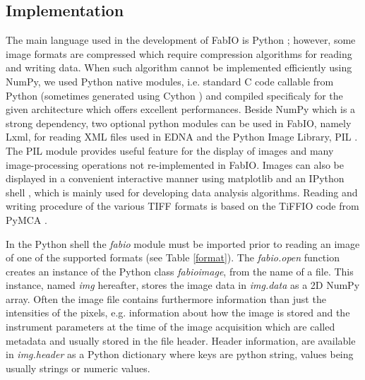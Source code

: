 \documentclass{iucr}
\begin{document}
\subsection{Implementation}
The main language used in the development of FabIO is Python \cite{python};
however, some image formats are compressed which require
compression algorithms for reading and writing data. When such algorithm cannot
be implemented efficiently using NumPy, we used Python native modules, i.e.
standard C code callable from Python (sometimes generated using Cython
\cite{cython}) and compiled specificaly for the given architecture which
offers excellent performances.
Beside NumPy which is a strong dependency, two optional python
modules can be used in FabIO, namely Lxml, for reading XML files used in EDNA
and the Python Image Library, PIL \cite{pil}.
The PIL module provides useful feature for the display of images and many
image-processing operations not re-implemented in FabIO.
% 
Images can also be displayed in a convenient interactive manner using
matplotlib \cite{matplotlib} and an IPython shell \cite{ipython}, which is
mainly used for developing data analysis algorithms.
Reading and writing procedure of the various TIFF \cite{tiff} formats is based
on the TiFFIO code from PyMCA \cite{pymca}.

In the Python shell the {\em fabio} module must be imported prior to reading an
image of one of the supported formats (see Table \ref{format}).
The {\em fabio.open} function creates an instance of the Python class {\em fabioimage},
from the name of a file. This instance, named {\em img} hereafter, stores the
image data in {\em img.data} as a 2D NumPy array. Often the image file contains
furthermore information than just the intensities of the pixels, e.g.
information about how the image is stored and the instrument parameters at the
time of the image acquisition which  are called metadata and usually stored in
the file header.
Header information, are available in {\em img.header} as a Python
dictionary where keys are python string, values being usually strings or
numeric values.
\end{document}
